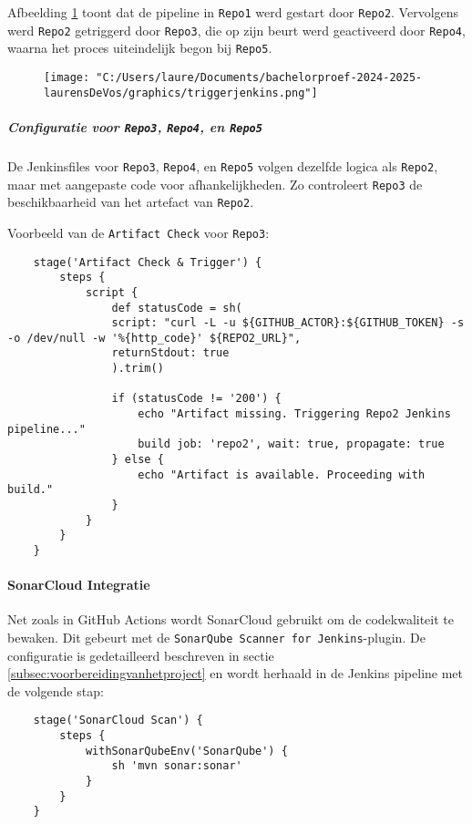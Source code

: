 Afbeelding \ref{fig:artifact_check_trigger} toont dat de pipeline in \texttt{Repo1} werd gestart door \texttt{Repo2}. Vervolgens werd \texttt{Repo2} getriggerd door \texttt{Repo3}, die op zijn beurt werd geactiveerd door \texttt{Repo4}, waarna het proces uiteindelijk begon bij \texttt{Repo5}.

\begin{figure}[h!]
    \centering
    \texttt{[image: "C:/Users/laure/Documents/bachelorproef-2024-2025-laurensDeVos/graphics/triggerjenkins.png"]}
    \label{fig:artifact_check_trigger}
\end{figure}

\subparagraph{Configuratie voor \texttt{Repo3}, \texttt{Repo4}, en \texttt{Repo5}}
De Jenkinsfiles voor \texttt{Repo3}, \texttt{Repo4}, en \texttt{Repo5} volgen dezelfde logica als \texttt{Repo2}, maar met aangepaste code voor afhankelijkheden. Zo controleert \texttt{Repo3} de beschikbaarheid van het artefact van \texttt{Repo2}.

Voorbeeld van de \texttt{Artifact Check} voor \texttt{Repo3}:

\begin{verbatim}
    stage('Artifact Check & Trigger') {
        steps {
            script {
                def statusCode = sh(
                script: "curl -L -u ${GITHUB_ACTOR}:${GITHUB_TOKEN} -s -o /dev/null -w '%{http_code}' ${REPO2_URL}",
                returnStdout: true
                ).trim()
                
                if (statusCode != '200') {
                    echo "Artifact missing. Triggering Repo2 Jenkins pipeline..."
                    build job: 'repo2', wait: true, propagate: true
                } else {
                    echo "Artifact is available. Proceeding with build."
                }
            }
        }
    }
\end{verbatim}

\paragraph{SonarCloud Integratie}
Net zoals in GitHub Actions wordt SonarCloud gebruikt om de codekwaliteit te bewaken. Dit gebeurt met de \texttt{SonarQube Scanner for Jenkins}-plugin. De configuratie is gedetailleerd beschreven in sectie \ref{subsec:voorbereidingvanhetproject} en wordt herhaald in de Jenkins pipeline met de volgende stap:

\begin{verbatim}
    stage('SonarCloud Scan') {
        steps {
            withSonarQubeEnv('SonarQube') {
                sh 'mvn sonar:sonar'
            }
        }
    }
\end{verbatim}

